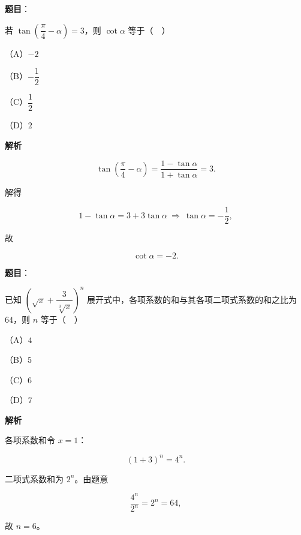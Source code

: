 \begin{answer}

\textbf{题目}：

若 $\tan\left(\dfrac{\pi}{4}-\alpha\right)=3$，则 $\cot\alpha$ 等于（　）

（A）$-2$

（B）$-\dfrac12$

（C）$\dfrac12$

（D）$2$

\textbf{解析}

\nopagebreak[4]
\[\tan\left(\frac{\pi}{4}-\alpha\right)=\frac{1-\tan\alpha}{1+\tan\alpha}=3.\]

解得

\nopagebreak[4]
\[1-\tan\alpha=3+3\tan\alpha\ \Rightarrow\ \tan\alpha=-\frac12,\]

故

\nopagebreak[4]
\[\cot\alpha=-2.\]


\end{answer}
\begin{answer}

\textbf{题目}：

已知 $\left(\sqrt x+\dfrac{3}{\sqrt[3]{x}}\right)^n$ 展开式中，各项系数的和与其各项二项式系数的和之比为 $64$，则 $n$ 等于（　）

（A）$4$

（B）$5$

（C）$6$

（D）$7$

\textbf{解析}

各项系数和令 $x=1$：

\nopagebreak[4]
\[(1+3)^n=4^n.\]

二项式系数和为 $2^n$。由题意

\nopagebreak[4]
\[\frac{4^n}{2^n}=2^n=64,\]

故 $n=6$。


\end{answer}
